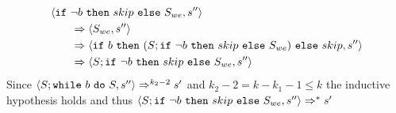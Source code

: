 \begin{exercise}
\begin{enumerate}
\begin{itemize}
\begin{itemize}
\begin{itemize}
\begin{itemize}
\begin{align*}
                                                &\left<\texttt{if}\ \neg b\ \texttt{then}\ skip\ \texttt{else}\ S_{we}, s''\right>
                                                \\&\qquad\Rightarrow \left<S_{we}, s''\right>
                                                \\&\qquad\Rightarrow \left<\texttt{if}\ b\ \texttt{then}\ (S; \texttt{if}\ \neg b\ \texttt{then}\ skip\ \texttt{else}\ S_{we})\ \texttt{else}\ skip, s''\right>
                                                \\&\qquad\Rightarrow \left<S; \texttt{if}\ \neg b\ \texttt{then}\ skip\ \texttt{else}\ S_{we}, s''\right>
                                            \end{align*}
                                            Since $\left<S; \texttt{while}\ b\ \texttt{do}\ S, s''\right> \Rightarrow^{k_2 - 2} s'$ and $k_2 - 2 = k - k_1 - 1 \leq k$ the inductive hypothesis holds and thus $\left<S; \texttt{if}\ \neg b\ \texttt{then}\ skip\ \texttt{else}\ S_{we}, s''\right> \Rightarrow^* s'$
                                    \end{itemize}
                            \end{itemize}
                    \end{itemize}
            \end{itemize}
    \end{enumerate}
\end{exercise}

